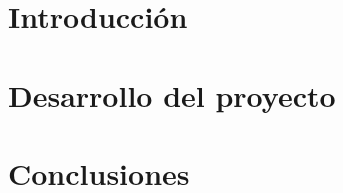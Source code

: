 \documentclass[12pt,a4paper]{book}
\begin{document}
\frontmatter











\mainmatter



\part{Introducción}



\part{Desarrollo del proyecto}





\part{Conclusiones}



\appendix



\backmatter


\end{document}
